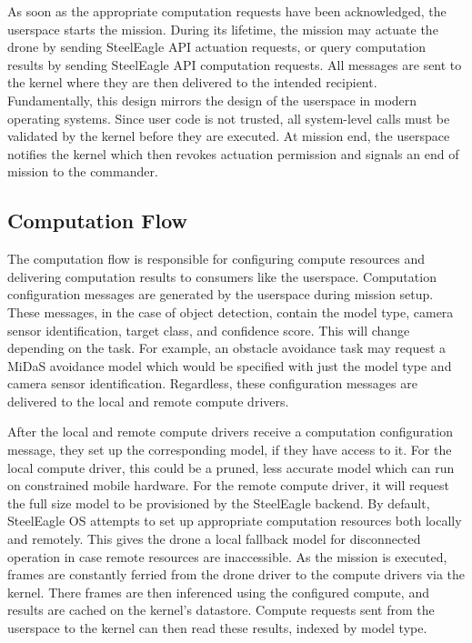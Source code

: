 As soon as the appropriate computation requests have been acknowledged, the userspace starts the mission. During its lifetime, the mission may actuate the drone by sending SteelEagle API actuation requests, or query computation results by sending SteelEagle API computation requests. All messages are sent to the kernel where they are then delivered to the intended recipient. Fundamentally, this design mirrors the design of the userspace in modern operating systems. Since user code is not trusted, all system-level calls must be validated by the kernel before they are executed. At mission end, the userspace notifies the kernel which then revokes actuation permission and signals an end of mission to the commander.

\subsection{Computation Flow}
\label{sec:computation-flow}
The computation flow is responsible for configuring compute resources and delivering computation results to consumers like the userspace. Computation configuration messages are generated by the userspace during mission setup. These messages, in the case of object detection, contain the model type, camera sensor identification, target class, and confidence score. This will change depending on the task. For example, an obstacle avoidance task may request a MiDaS avoidance model which would be specified with just the model type and camera sensor identification. Regardless, these configuration messages are delivered to the local and remote compute drivers.

After the local and remote compute drivers receive a computation configuration message, they set up the corresponding model, if they have access to it. For the local compute driver, this could be a pruned, less accurate model which can run on constrained mobile hardware. For the remote compute driver, it will request the full size model to be provisioned by the SteelEagle backend. By default, SteelEagle OS attempts to set up appropriate computation resources both locally and remotely. This gives the drone a local fallback model for disconnected operation in case remote resources are inaccessible. As the mission is executed, frames are constantly ferried from the drone driver to the compute drivers via the kernel. There frames are then inferenced using the configured compute, and results are cached on the kernel's datastore. Compute requests sent from the userspace to the kernel can then read these results, indexed by model type.  

